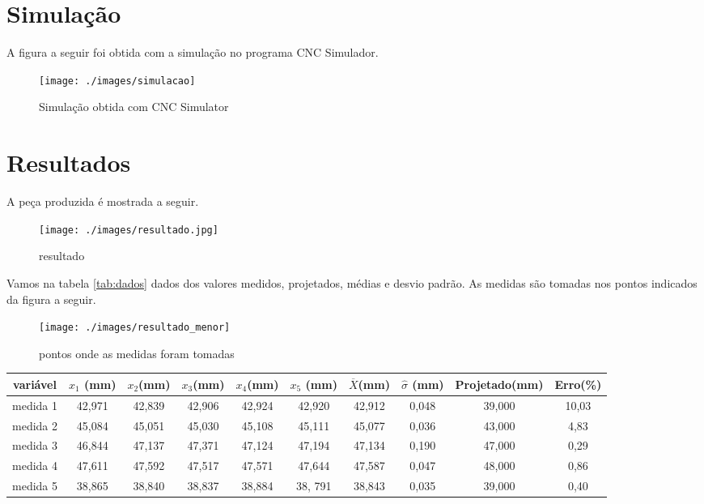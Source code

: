 \section{Simulação}
A figura a seguir foi obtida com a simulação no programa CNC Simulador.
\begin{figure}[H]
\centering
\texttt{[image: ./images/simulacao]}
\caption{Simulação obtida com CNC Simulator}
\end{figure}

\section{Resultados}
A peça produzida é mostrada a seguir.

\begin{figure}[H]
\centering
\texttt{[image: ./images/resultado.jpg]}
\caption{resultado}
\end{figure}

Vamos na tabela \ref{tab:dados} dados dos valores medidos, projetados, médias e desvio padrão. As medidas são tomadas nos pontos indicados da figura a seguir.
\begin{figure}[H]
\centering
\texttt{[image: ./images/resultado\_menor]}
\caption{ pontos onde as medidas foram tomadas}
\end{figure}

\begin{table*}[htp]
\centering
\begin{tabular}{|c|c|c|c|c|c|c|c|c|c|} \hline
variável & $x_1$ (mm)& $x_2$(mm) & $x_3$(mm)& $x_4$(mm)& $x_5$ (mm)& $\overline{X}$(mm) & $\widehat{\sigma}$ (mm) & Projetado(mm) & Erro(\%) \\ \hline
medida 1& 42,971& 42,839&  42,906 & 42,924 & 42,920 &42,912  & 0,048 & 39,000 & 10,03 \\ \hline
medida 2& 45,084& 45,051& 45,030& 45,108& 45,111 &45,077  & 0,036 & 43,000 & 4,83\\ \hline
medida 3& 46,844 & 47,137 & 47,371& 47,124 & 47,194 &47,134 & 0,190 &47,000 &0,29 \\ \hline
medida 4& 47,611& 47,592& 47,517& 47,571& 47,644 &47,587  & 0,047 & 48,000 & 0,86\\ \hline
medida 5& 38,865 & 38,840 & 38,837 & 38,884 & 38, 791 & 38,843 &  0,035 &39,000 & 0,40\\ \hline 
\end{tabular}
\caption{Dados Experimentais e Estatísticos}
\label{tab:dados}
\end{table*}

